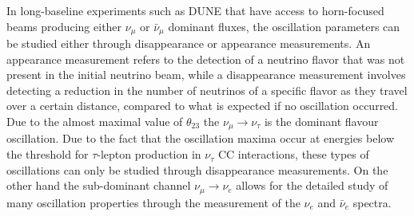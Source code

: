 In long-baseline experiments such as DUNE that have access to horn-focused beams producing either $\nu_\mu$ or $\bar{\nu}_\mu$ dominant fluxes, the oscillation parameters can be studied either through disappearance or appearance measurements. An appearance measurement refers to the detection of a neutrino flavor that was not present in the initial neutrino beam, while a disappearance measurement involves detecting a reduction in the number of neutrinos of a specific flavor as they travel over a certain distance, compared to what is expected if no oscillation occurred. Due to the almost maximal value of $\theta_{23}$ the $\nu_\mu\rightarrow\nu_\tau$ is the dominant flavour oscillation. Due to the fact that the oscillation maxima occur at energies below the threshold for $\tau$-lepton production in $\nu_\tau$ CC interactions, these types of oscillations can only be studied through disappearance measurements. On the other hand the sub-dominant channel $\nu_\mu\rightarrow\nu_e$ allows for the detailed study of many oscillation properties through the measurement of the $\nu_e$ and $\bar{\nu}_e$ spectra.

